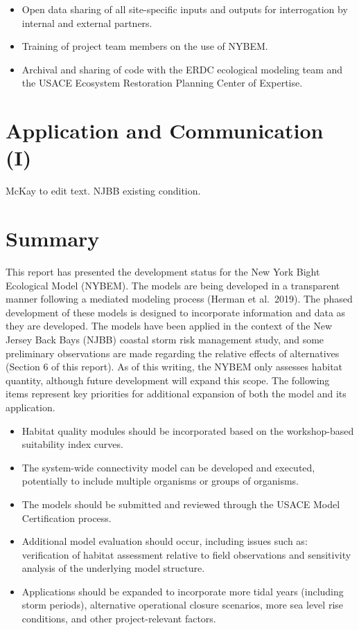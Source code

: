 \documentclass[
]{book}
\begin{document}
\begin{itemize}
\item
  Open data sharing of all site-specific inputs and outputs for interrogation by internal and external partners.
\item
  Training of project team members on the use of NYBEM.
\item
  Archival and sharing of code with the ERDC ecological modeling team and the USACE Ecosystem Restoration Planning Center of Expertise.
\end{itemize}

\hypertarget{application-and-communication-i}{%
\chapter{Application and Communication (I)}\label{application-and-communication-i}}

{McKay to edit text. NJBB existing condition.}

\hypertarget{summary}{%
\chapter{Summary}\label{summary}}

This report has presented the development status for the New York Bight Ecological Model (NYBEM). The models are being developed in a transparent manner following a mediated modeling process (Herman et al.~2019). The phased development of these models is designed to incorporate information and data as they are developed. The models have been applied in the context of the New Jersey Back Bays (NJBB) coastal storm risk management study, and some preliminary observations are made regarding the relative effects of alternatives (Section 6 of this report).
As of this writing, the NYBEM only assesses habitat quantity, although future development will expand this scope. The following items represent key priorities for additional expansion of both the model and its application.

\begin{itemize}
\item
  Habitat quality modules should be incorporated based on the workshop-based suitability index curves.
\item
  The system-wide connectivity model can be developed and executed, potentially to include multiple organisms or groups of organisms.
\item
  The models should be submitted and reviewed through the USACE Model Certification process.
\item
  Additional model evaluation should occur, including issues such as: verification of habitat assessment relative to field observations and sensitivity analysis of the underlying model structure.
\item
  Applications should be expanded to incorporate more tidal years (including storm periods), alternative operational closure scenarios, more sea level rise conditions, and other project-relevant factors.
\end{itemize}
\end{document}
